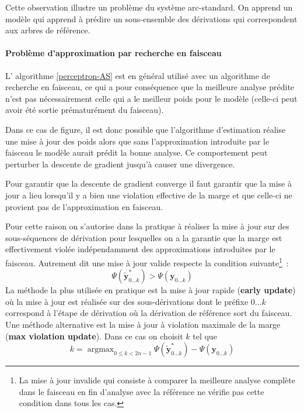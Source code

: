 \documentclass[11pt,openany]{book}
\begin{document}
Cette observation illustre un problème du système arc-standard. On
apprend un modèle qui apprend à prédire un sous-ensemble des
dérivations qui correspondent aux arbres de référence.

 \paragraph{Problème d'approximation par recherche en faisceau}
L' algorithme \ref{perceptron-AS} est en général utilisé avec un
algorithme de recherche en faisceau, ce qui a pour conséquence que la
meilleure analyse prédite n'est pas nécessairement celle qui a le meilleur
poids pour le modèle (celle-ci peut avoir été sortie prématurément du faisceau).

Dans ce cas de figure, il est donc possible que l'algorithme
d'estimation réalise une mise à jour des poids alors que sans
l'approximation introduite par le faisceau
le modèle aurait prédit la bonne analyse. Ce comportement peut
perturber la descente de gradient jusqu'à causer une divergence.

Pour garantir que la descente de gradient converge il faut garantir
que la mise à jour a lieu lorsqu'il y a bien une violation effective de la marge
et que celle-ci ne provient pas de l'approximation en faisceau.

Pour cette raison on s'autorise dans la pratique à réaliser la mise à
jour sur des sous-séquences de dérivation pour lesquelles on a la
garantie que la marge est effectivement violée indépendamment des
approximations introduites par le faisceau. Autrement dit une mise à
jour valide respecte la condition suivante\footnote{
La mise à jour invalide qui consiste à comparer la meilleure analyse complète
dans le faisceau en fin d'analyse avec la référence ne vérifie pas cette condition dans tous les cas. 
}~:
\begin{equation}
\Psi(\tilde{\mathbf{y}}^*_{0\ldots k}) > \Psi(\mathbf{y}_{0\ldots k})
\end{equation}
La méthode la plus utilisée en pratique est la mise à jour rapide
({\bf early update}) où la mise à jour est réalisée sur des
sous-dérivations dont le préfixe $0\ldots k$ correspond à l'étape de
dérivation où la dérivation de référence sort du faisceau. Une méthode
alternative est la mise à jour à violation maximale de la marge ({\bf max violation update}). 
Dans ce cas on choisit $k$ tel que 
\begin{displaymath}
k = \mathop{\text{argmax}}_{0 \leq k
 < 2n-1}\Psi(\tilde{\mathbf{y}}^*_{0\ldots k}) -
\Psi(\mathbf{y}_{0\ldots k})
\end{displaymath}
\end{document}
